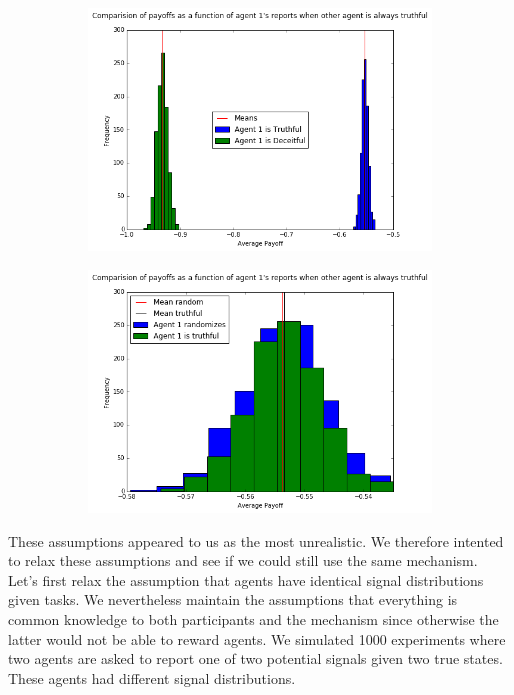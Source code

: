 \documentclass{scrartcl}
\begin{document}
\begin{figure}[H]
\caption{Computational verification of Property 1}
\begin{subfigure}{0.4\textwidth}
\includegraphics[scale=0.4]{pp_1}
\end{subfigure}
\hspace{0.1\textwidth}
\begin{subfigure}{0.4\textwidth}
\includegraphics[scale=0.4]{rand}
\end{subfigure}
\end{figure}
These assumptions appeared to us as the most unrealistic. We therefore intented to relax these assumptions and see if we could still use the same mechanism. Let's first relax the assumption that agents have identical signal distributions given tasks. We nevertheless maintain the assumptions that everything is common knowledge to both participants and the mechanism since otherwise the latter would not be able to reward agents. We simulated 1000 experiments where two agents are asked to report one of two potential signals given two true states. These agents had different signal distributions. 
\end{document}

